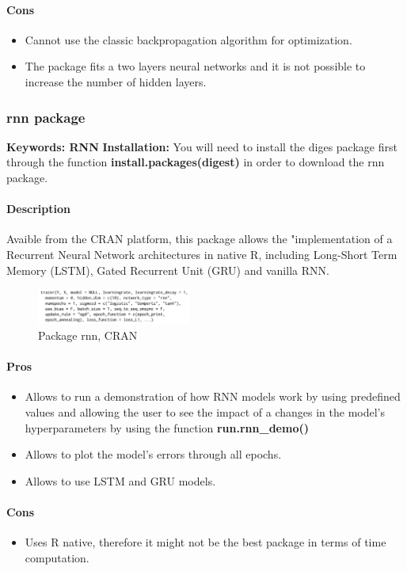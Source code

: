 \documentclass[6pt,letter]{article}\usepackage[]{graphicx}\usepackage[]{color}
\begin{document}
\paragraph{Cons}
\begin{itemize}
\item Cannot use the classic backpropagation algorithm for optimization.
\item The package fits a two layers neural networks and it is not possible to increase the number of hidden layers.
\end{itemize}

\subsubsection{rnn package}
\textbf{Keywords: RNN}
\textbf{Installation:} You will need to install the diges package first through the function \textbf{install.packages(digest)} in order to download the rnn package.
\paragraph{Description}
Avaible from the CRAN platform, this package allows the "implementation of a Recurrent Neural Network architectures in native R, including Long-Short Term Memory (LSTM), Gated Recurrent Unit (GRU) and vanilla RNN. 
\begin{figure}[h]
    \centering
    \includegraphics[width=0.45\textwidth]{figure/rnn_package.png}
     \caption{Package rnn, CRAN}
\end{figure}
\paragraph{Pros}
\begin{itemize}
\item Allows to run a demonstration of how RNN models work by using predefined values and allowing the user to see the impact of a changes in the model's hyperparameters by using the function \textbf{run.rnn\_demo()}
\item Allows to plot the model's errors through all epochs.
\item Allows to use LSTM and GRU models.
\end{itemize}
\paragraph{Cons}
\begin{itemize}
\item Uses R native, therefore it might not be the best package in terms of time computation.
\end{itemize}
\end{document}
